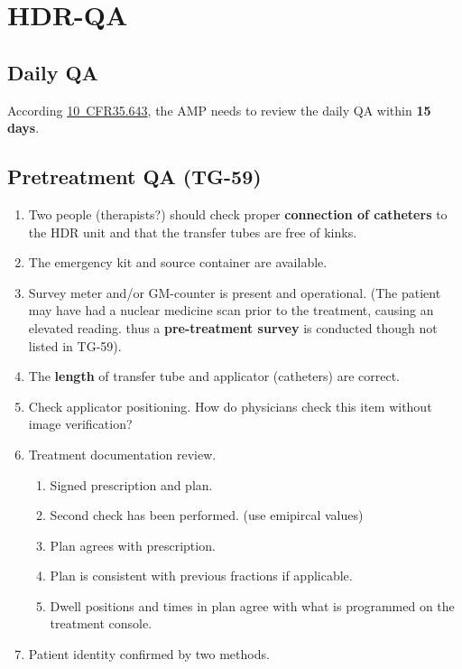 \documentclass[]{book}
\providecommand{\tightlist}{%
  \setlength{\itemsep}{0pt}\setlength{\parskip}{0pt}}
\theoremstyle{definition}
\theoremstyle{definition}
\theoremstyle{definition}
\theoremstyle{remark}
\begin{document}
\section{HDR-QA}\label{hdr-qa}

\subsection{Daily QA}\label{daily-qa}

According
\href{https://www.nrc.gov/reading-rm/doc-collections/cfr/part035/part035-0643.html}{10~CFR35.643},
the AMP needs to review the daily QA within \textbf{15 days}.

\subsection{Pretreatment QA (TG-59)}\label{pretreatment-qa-tg-59}

\begin{enumerate}
\def\labelenumi{\arabic{enumi}.}
\tightlist
\item
  Two people (therapists?) should check proper \textbf{connection of
  catheters} to the HDR unit and that the transfer tubes are free of
  kinks.
\item
  The emergency kit and source container are available.
\item
  Survey meter and/or GM-counter is present and operational. (The
  patient may have had a nuclear medicine scan prior to the treatment,
  causing an elevated reading. thus a \textbf{pre-treatment survey} is
  conducted though not listed in TG-59).
\item
  The \textbf{length} of transfer tube and applicator (catheters) are
  correct.
\item
  Check applicator positioning. How do physicians check this item
  without image verification?
\item
  Treatment documentation review.

  \begin{enumerate}
  \def\labelenumii{\alph{enumii}.}
  \tightlist
  \item
    Signed prescription and plan.
  \item
    Second check has been performed. (use emipircal values)
  \item
    Plan agrees with prescription.
  \item
    Plan is consistent with previous fractions if applicable.
  \item
    Dwell positions and times in plan agree with what is programmed on
    the treatment console.
  \end{enumerate}
\item
  Patient identity confirmed by two methods.
\end{enumerate}
\end{document}
